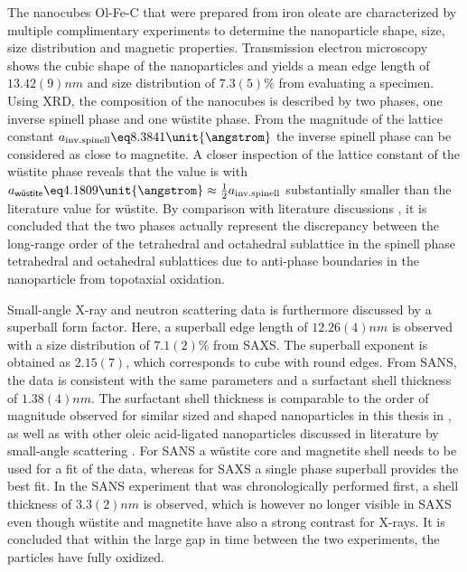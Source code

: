 \documentclass[\main/dresen_thesis.tex]{subfiles}
\begin{document}
  \label{sec:colloidalCrystals:nanoparticle:summary}
  The nanocubes Ol-Fe-C that were prepared from iron oleate are characterized by multiple complimentary experiments to determine the nanoparticle shape, size, size distribution and magnetic properties.
  Transmission electron microscopy shows the cubic shape of the nanoparticles and yields a mean edge length of $13.42(9) \unit{nm}$ and size distribution of $7.3(5) \%$ from evaluating a specimen.
  Using XRD, the composition of the nanocubes is described by two phases, one inverse spinell phase and one w\"ustite phase.
  From the magnitude of the lattice constant $a_\mathrm{inv. spinell} \eq 8.3841 \unit{\angstrom}$ the inverse spinell phase can be considered as close to magnetite.
  A closer inspection of the lattice constant of the w\"ustite phase reveals that the value is with $a_\textsf{w\"ustite} \eq 4.1809 \unit{\angstrom} \approx \tfrac{1}{2} a_\mathrm{inv. spinell}$ substantially smaller than the literature value for w\"ustite.
  By comparison with literature discussions \cite{Wetterskog_2013_Anoma}, it is concluded that the two phases actually represent the discrepancy between the long-range order of the tetrahedral and octahedral sublattice in the spinell phase tetrahedral and octahedral sublattices due to anti-phase boundaries in the nanoparticle from topotaxial oxidation.

  Small-angle X-ray and neutron scattering data is furthermore discussed by a superball form factor.
  Here, a superball edge length of $12.26(4) \unit{nm}$ is observed with a size distribution of $7.1(2) \%$ from SAXS.
  The superball exponent is obtained as $2.15(7)$, which corresponds to cube with round edges.
  From SANS, the data is consistent with the same parameters and a surfactant shell thickness of $1.38(4) \unit{nm}$.
  The surfactant shell thickness is comparable to the order of magnitude observed for similar sized and shaped nanoparticles in this thesis in , as well as with other oleic acid-ligated nanoparticles discussed in literature by small-angle scattering \cite{Disch_2012_Quant}.
  For SANS a w\"ustite core and magnetite shell needs to be used for a fit of the data, whereas for SAXS a single phase superball provides the best fit.
  In the SANS experiment that was chronologically performed first, a shell thickness of $3.3(2) \unit{nm}$ is observed, which is however no longer visible in SAXS even though w\"ustite and magnetite have also a strong contrast for X-rays.
  It is concluded that within the large gap in time between the two experiments, the particles have fully oxidized.
  \\
\end{document}
